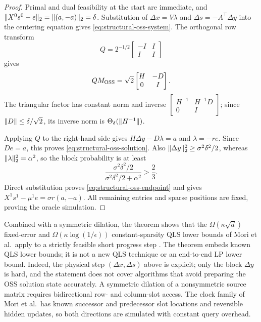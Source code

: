 \begin{proof}
Primal and dual feasibility at the start are immediate, and
$\lVert X^0s^0-e\rVert_2=\lVert(a,-a)\rVert_2=\delta$.  Substitution of
$\Delta x=V\lambda$ and $\Delta s=-A^\top\Delta y$ into the centering equation
gives \eqref{eq:structural-oss-system}.  The orthogonal row transform
\[
 Q=2^{-1/2}\begin{bmatrix}-I&I\\I&I\end{bmatrix}
\]
gives
\begin{equation}
 QM_{\rm OSS}=\sqrt2\begin{bmatrix}H&-D\\0&I\end{bmatrix}.
\end{equation}
The triangular factor has constant norm and inverse
$\left[\begin{smallmatrix}H^{-1}&H^{-1}D\\0&I\end{smallmatrix}\right]$;
since $\lVert D\rVert\leq\delta/\sqrt2$, its inverse norm is
$\Theta_\delta(\lVert H^{-1}\rVert)$.

Applying $Q$ to the right-hand side gives
$H\Delta y-D\lambda=a$ and $\lambda=-re$.  Since $De=a$, this proves
\eqref{eq:structural-oss-solution}.  Also
$\lVert\Delta y\rVert_2^2\geq\sigma^2\delta^2/2$, whereas
$\lVert\lambda\rVert_2^2=\alpha^2$, so the block probability is at least
\[
 \frac{\sigma^2\delta^2/2}{\sigma^2\delta^2/2+\alpha^2}>\frac23.
\]
Direct substitution proves \eqref{eq:structural-oss-endpoint} and gives
$X^1s^1-\mu^1e=\sigma r(a,-a)$.  All remaining entries and sparse positions
are fixed, proving the oracle simulation.
\end{proof}

Combined with a symmetric dilation, the theorem shows that the
$\Omega(\kappa\sqrt d)$ fixed-error and
$\Omega(\kappa\log(1/\epsilon))$ constant-sparsity QLS lower bounds of
Mori et al.\ apply to a strictly feasible short progress step
\cite{mori2026-sparsity-dependent-complexity-lower-bound}.  The theorem
embeds known QLS lower bounds; it is not a new QLS technique or an
end-to-end LP lower bound.  Indeed, the physical step $(\Delta x,\Delta s)$
above is explicit; only the block $\Delta y$ is hard, and the statement does
not cover algorithms that avoid preparing the OSS solution state accurately.
A symmetric dilation of a nonsymmetric source matrix requires
bidirectional row- and column-slot access.  The clock family of Mori et al.\
has known successor and predecessor slot locations and reversible hidden
updates, so both directions are simulated with constant query overhead.

